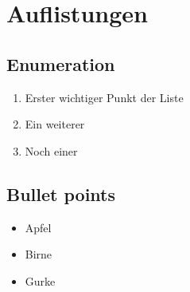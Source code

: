 \chapter{Auflistungen}

\section{Enumeration}
\begin{enumerate}
 \item Erster wichtiger Punkt der Liste
 \item Ein weiterer
 \item Noch einer
\end{enumerate}

\section{Bullet points}
\begin{itemize}
 \item Apfel
 \item Birne
 \item Gurke
\end{itemize}
